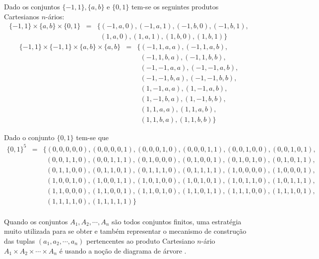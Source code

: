 \begin{exem}\label{exe:CartesianoNario1}
	Dado os conjuntos $\{-1, 1\}, \{a, b\}$ e $\{0, 1\}$ tem-se os seguintes produtos Cartesianos $n$-ários:
	\begin{eqnarray*}
		\{-1, 1\} \times \{a, b\} \times \{0, 1\} & = & \{(-1, a, 0), (-1, a, 1), (-1, b, 0), (-1, b, 1), \\
		& & \ \ (1, a, 0), (1, a, 1), (1, b, 0), (1, b, 1)\}
	\end{eqnarray*}
	\begin{eqnarray*}
		\{-1, 1\} \times \{-1, 1\} \times \{a, b\} \times \{a, b\} & = & \{ (-1, 1, a, a), (-1, 1, a, b), \\
		& & \ \ (-1, 1, b, a),  (-1, 1, b, b), \\
		& & \ \ (-1, -1, a, a), (-1, -1, a, b),\\
		& & \ \ (-1, -1, b, a), (-1, -1, b, b),\\
		& & \ \ (1, -1, a, a),  (1, -1, a, b),\\
		& & \ \ (1, -1, b, a),  (1, -1, b, b),\\
		& & \ \ (1, 1, a, a),   (1, 1, a, b),\\
		& & \ \ (1, 1, b, a),   (1, 1, b, b) \}
	\end{eqnarray*}
\end{exem}

\begin{exem}\label{exe:CartesianoNario2}
	Dado o conjunto $\{0,1\}$ tem-se que 
	\begin{eqnarray*}
		\{0, 1\}^5 & = & \{ (0, 0, 0, 0, 0), (0, 0, 0, 0, 1), (0, 0, 0, 1, 0), (0, 0, 0, 1, 1), (0, 0, 1, 0, 0), (0, 0, 1, 0, 1),\\
		& & \ \ (0, 0, 1, 1, 0), (0, 0, 1, 1, 1), (0, 1, 0, 0, 0), (0, 1, 0, 0, 1), (0, 1, 0, 1, 0), (0, 1, 0, 1, 1),\\
		& & \ \ (0, 1, 1, 0, 0), (0, 1, 1, 0, 1), (0, 1, 1, 1, 0), (0, 1, 1, 1, 1), (1, 0, 0, 0, 0), (1, 0, 0, 0, 1),\\
		& & \ \ (1, 0, 0, 1, 0), (1, 0, 0, 1, 1), (1, 0, 1, 0, 0), (1, 0, 1, 0, 1), (1, 0, 1, 1, 0), (1, 0, 1, 1, 1),\\
		& & \ \ (1, 1, 0, 0, 0), (1, 1, 0, 0, 1), (1, 1, 0, 1, 0), (1, 1, 0, 1, 1), (1, 1, 1, 0, 0), (1, 1, 1, 0, 1),\\
		& & \ \ (1, 1, 1, 1, 0), (1, 1, 1, 1, 1)\}\\
	\end{eqnarray*}
\end{exem}

Quando os conjuntos $A_1, A_2, \cdots, A_n$ são todos conjuntos finitos, uma estratégia muito utilizada para se obter e também representar o mecanismo de construção das tuplas $(a_1, a_2, \cdots, a_n)$ pertencentes ao produto Cartesiano $n$-ário $A_1 \times A_2 \times \cdots \times A_n$ é usando a noção de diagrama de árvore \cite{lipschutz1978-TC, lipschutz2013-MD}.

